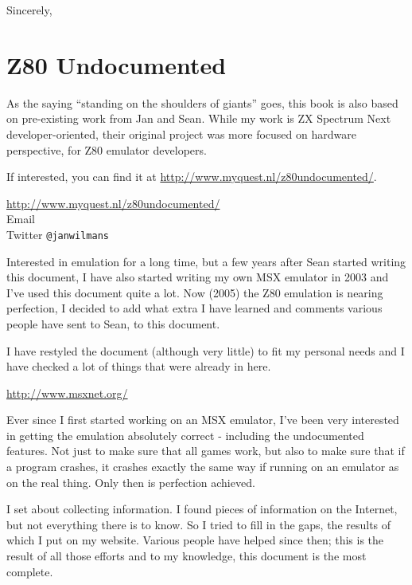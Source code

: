Sincerely, \AuthorName


\pagebreak
\section{Z80 Undocumented}

As the saying ``standing on the shoulders of giants'' goes, this book is also based on pre-existing work from Jan and Sean. While my work is ZX Spectrum Next developer-oriented, their original project was more focused on hardware perspective, for Z80 emulator developers.

If interested, you can find it at \url{http://www.myquest.nl/z80undocumented/}.

\begin{description}[style=unboxed,leftmargin=0cm]
	\item[Jan]\hfill
	
	\url{http://www.myquest.nl/z80undocumented/}\\
	Email \\
	Twitter {\tt @janwilmans}

	Interested in emulation for a long time, but a few years after Sean started writing this document, I have also started writing my own MSX emulator in 2003 and I've used this document quite a lot. Now (2005) the Z80 emulation is nearing perfection, I decided to add what extra I have learned and comments various people have sent to Sean, to this document.

	I have restyled the document (although very little) to fit my personal needs and I have checked a lot of things that were already in here.
 
	\item[Sean]\hfill

	\url{http://www.msxnet.org/}
	
	Ever since I first started working on an MSX emulator, I've been very interested in getting the emulation absolutely correct - including the undocumented features. Not just to make sure that all games work, but also to make sure that if a program crashes, it crashes exactly the same way if running on an emulator as on the real thing. Only then is perfection achieved.

	I set about collecting information. I found pieces of information on the Internet, but not everything there is to know. So I tried to fill in the gaps, the results of which I put on my website. Various people have helped since then; this is the result of all those efforts and to my knowledge, this document is the most complete.
\end{description}


